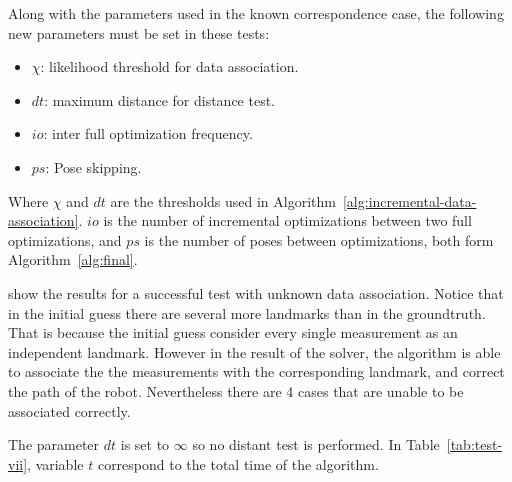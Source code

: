 Along with the parameters used in the known correspondence case, the following new parameters must be set in these tests:

\begin{itemize}
\item $\chi$: likelihood threshold for data association.
\item $dt$: maximum distance for distance test.
\item $io$: inter full optimization frequency.
\item $ps$: Pose skipping.
\end{itemize}

Where $\chi$ and $dt$ are the thresholds used in Algorithm~\ref{alg:incremental-data-association}. $io$ is the number of incremental optimizations between two full optimizations, and $ps$ is the number of poses between optimizations, both form Algorithm~\ref{alg:final}.

 show the results for a successful test with unknown data association. Notice that in the initial guess there are several more landmarks than in the groundtruth. That is because the initial guess consider every single measurement as an independent landmark. However in the result of the solver, the algorithm is able to associate the the measurements with the corresponding landmark, and correct the path of the robot. Nevertheless there are 4 cases that are unable to be associated correctly.

The parameter $dt$ is set to $\infty$ so no distant test is performed. In Table~\ref{tab:test-vii}, variable $t$ correspond to the total time of the algorithm. 

